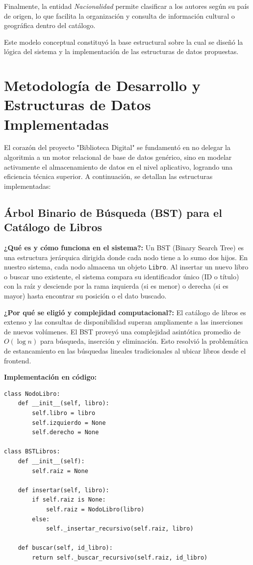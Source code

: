 \documentclass{rapport}
\begin{document}
Finalmente, la entidad \textit{Nacionalidad} permite clasificar a los autores según su país de origen, lo que facilita la organización y consulta de información cultural o geográfica dentro del catálogo.

Este modelo conceptual constituyó la base estructural sobre la cual se diseñó la lógica del sistema y la implementación de las estructuras de datos propuestas.

\section{Metodología de Desarrollo y Estructuras de Datos Implementadas}

El corazón del proyecto "Biblioteca Digital" se fundamentó en no delegar la algoritmia a un motor relacional de base de datos genérico, sino en modelar activamente el almacenamiento de datos en el nivel aplicativo, logrando una eficiencia técnica superior. A continuación, se detallan las estructuras implementadas:

\subsection{Árbol Binario de Búsqueda (BST) para el Catálogo de Libros}
\textbf{¿Qué es y cómo funciona en el sistema?:} Un BST (Binary Search Tree) es una estructura jerárquica dirigida donde cada nodo tiene a lo sumo dos hijos. En nuestro sistema, cada nodo almacena un objeto \texttt{Libro}. Al insertar un nuevo libro o buscar uno existente, el sistema compara su identificador único (ID o título) con la raíz y desciende por la rama izquierda (si es menor) o derecha (si es mayor) hasta encontrar su posición o el dato buscado.

\textbf{¿Por qué se eligió y complejidad computacional?:} El catálogo de libros es extenso y las consultas de disponibilidad superan ampliamente a las inserciones de nuevos volúmenes. El BST proveyó una complejidad asintótica promedio de $O(\log n)$ para búsqueda, inserción y eliminación. Esto resolvió la problemática de estancamiento en las búsquedas lineales tradicionales al ubicar libros desde el frontend.

\textbf{Implementación en código:}
\begin{verbatim}
class NodoLibro:
    def __init__(self, libro):
        self.libro = libro
        self.izquierdo = None
        self.derecho = None

class BSTLibros:
    def __init__(self):
        self.raiz = None
        
    def insertar(self, libro):
        if self.raiz is None:
            self.raiz = NodoLibro(libro)
        else:
            self._insertar_recursivo(self.raiz, libro)
            
    def buscar(self, id_libro):
        return self._buscar_recursivo(self.raiz, id_libro)
\end{verbatim}
\end{document}
